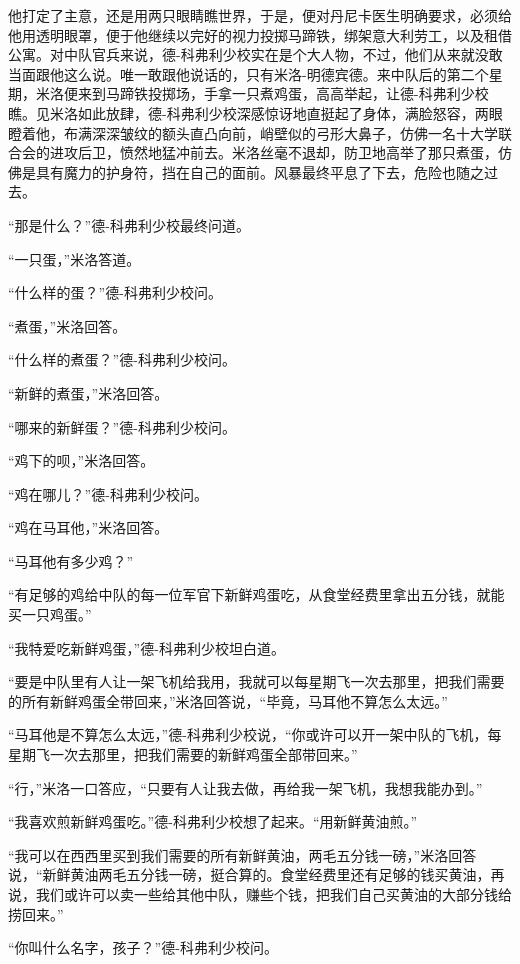     他打定了主意，还是用两只眼睛瞧世界，于是，便对丹尼卡医生明确要求，必须给他用透明眼罩，便于他继续以完好的视力投掷马蹄铁，绑架意大利劳工，以及租借公寓。对中队官兵来说，德-科弗利少校实在是个大人物，不过，他们从来就没敢当面跟他这么说。唯一敢跟他说话的，只有米洛-明德宾德。来中队后的第二个星期，米洛便来到马蹄铁投掷场，手拿一只煮鸡蛋，高高举起，让德-科弗利少校瞧。见米洛如此放肆，德-科弗利少校深感惊讶地直挺起了身体，满脸怒容，两眼瞪着他，布满深深皱纹的额头直凸向前，峭壁似的弓形大鼻子，仿佛一名十大学联合会的进攻后卫，愤然地猛冲前去。米洛丝毫不退却，防卫地高举了那只煮蛋，仿佛是具有魔力的护身符，挡在自己的面前。风暴最终平息了下去，危险也随之过去。

    “那是什么？”德-科弗利少校最终问道。

    “一只蛋，”米洛答道。

    “什么样的蛋？”德-科弗利少校问。

    “煮蛋，”米洛回答。

    “什么样的煮蛋？”德-科弗利少校问。

    “新鲜的煮蛋，”米洛回答。

    “哪来的新鲜蛋？”德-科弗利少校问。

    “鸡下的呗，”米洛回答。

    “鸡在哪儿？”德-科弗利少校问。

    “鸡在马耳他，”米洛回答。

    “马耳他有多少鸡？”

    “有足够的鸡给中队的每一位军官下新鲜鸡蛋吃，从食堂经费里拿出五分钱，就能买一只鸡蛋。”

    “我特爱吃新鲜鸡蛋，”德-科弗利少校坦白道。

    “要是中队里有人让一架飞机给我用，我就可以每星期飞一次去那里，把我们需要的所有新鲜鸡蛋全带回来，”米洛回答说，“毕竟，马耳他不算怎么太远。”

    “马耳他是不算怎么太远，”德-科弗利少校说，“你或许可以开一架中队的飞机，每星期飞一次去那里，把我们需要的新鲜鸡蛋全部带回来。”

    “行，”米洛一口答应，“只要有人让我去做，再给我一架飞机，我想我能办到。”

    “我喜欢煎新鲜鸡蛋吃。”德-科弗利少校想了起来。“用新鲜黄油煎。”

    “我可以在西西里买到我们需要的所有新鲜黄油，两毛五分钱一磅，”米洛回答说，“新鲜黄油两毛五分钱一磅，挺合算的。食堂经费里还有足够的钱买黄油，再说，我们或许可以卖一些给其他中队，赚些个钱，把我们自己买黄油的大部分钱给捞回来。”

    “你叫什么名字，孩子？”德-科弗利少校问。

